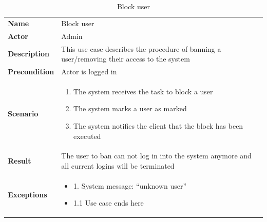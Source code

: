 \begin{table}[ht]
    \caption{Block user}
    \begin{tabular}{|L{5cm}|L{10cm}|}
        \toprule
        \textbf{Name}         & Block user                                                                                       \\
        \textbf{Actor}        & Admin                                                                                            \\
        \textbf{Description}  & This use case describes the procedure of banning a user/removing their access to the system      \\
        \textbf{Precondition} & Actor is logged in                                                                               \\
        \textbf{Scenario} &
        \vspace{-0.75cm}
        \begin{enumerate}
            \setlength\itemsep{-0.5em}
            \item The system receives the task to block a user
            \item The system marks a user as marked
            \item The system notifies the client that the block has been executed
        \end{enumerate} \\[-0.5cm]
        \textbf{Result}       & The user to ban can not log in into the system anymore and all current logins will be terminated \\
        \textbf{Exceptions} &
        \vspace{-0.75cm}
        \begin{itemize}
            \setlength\itemsep{-0.5em}
            \item 1. System message: \enquote{unknown user}
            \item 1.1 Use case ends here
        \end{itemize} \\
        \bottomrule
    \end{tabular}
    \label{tab:table28}
\end{table}

